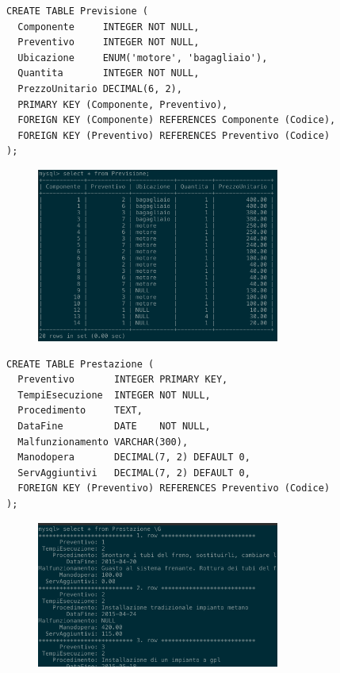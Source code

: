     \begin{lstlisting}
CREATE TABLE Previsione (
  Componente     INTEGER NOT NULL,
  Preventivo     INTEGER NOT NULL,
  Ubicazione     ENUM('motore', 'bagagliaio'),
  Quantita       INTEGER NOT NULL,
  PrezzoUnitario DECIMAL(6, 2),
  PRIMARY KEY (Componente, Preventivo),
  FOREIGN KEY (Componente) REFERENCES Componente (Codice),
  FOREIGN KEY (Preventivo) REFERENCES Preventivo (Codice)
);
    \end{lstlisting}
    \begin{figure}[H]
      \centering
      \includegraphics[width=8cm]{images/screenshots/schema/previsione.png}
    \end{figure}

    \begin{lstlisting}
CREATE TABLE Prestazione (
  Preventivo       INTEGER PRIMARY KEY,
  TempiEsecuzione  INTEGER NOT NULL,
  Procedimento     TEXT,
  DataFine         DATE    NOT NULL,
  Malfunzionamento VARCHAR(300),
  Manodopera       DECIMAL(7, 2) DEFAULT 0,
  ServAggiuntivi   DECIMAL(7, 2) DEFAULT 0,
  FOREIGN KEY (Preventivo) REFERENCES Preventivo (Codice)
);
    \end{lstlisting}
    \begin{figure}[H]
      \centering
      \includegraphics[width=8cm]{images/screenshots/schema/prestazione.png}
    \end{figure}

